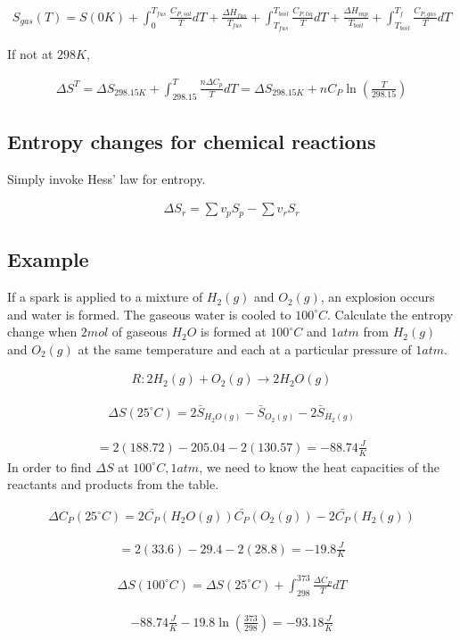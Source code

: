 \documentclass[12pt]{book}
\begin{document}
\begin{align*}
    S_{gas}(T)=S(0K)+\int_{0}^{T_{fus}}\frac{C_{P,sol}}{T} dT+\frac{\Delta H_{fus}}{T_{fus}}+\int_{T_{fus}}^{T_{boil}}\frac{C_{P,liq}}{T} dT+\frac{\Delta H_{vap}}{T_{boil}}+\int_{T_{boil}}^{T_{f}}\frac{C_{P,gas}}{T}dT
\end{align*}

If not at $298K$,

\begin{align*}
    \Delta S^T=\Delta S_{298.15K}+\int_{298.15}^{T}\frac{n\Delta C_p}{T}dT=\Delta S_{298.15K}+nC_P\ln\left(\frac{T}{298.15}\right)
\end{align*}

\subsection*{Entropy changes for chemical reactions}

Simply invoke Hess' law for entropy.

\begin{align*}
    \Delta S_r=\sum v_p S_{p}-\sum v_r S_r
\end{align*}

\subsection*{Example}

If a spark is applied to a mixture of $H_2(g)$ and $O_2(g)$, an explosion occurs and
water is formed. The gaseous water is cooled to $100^{\circ}C$. Calculate the entropy
change when $2 mol$ of gaseous $H_2O$ is formed at $100^{\circ}C$ and $1 atm$ from $H_2(g)$
and $O_2(g)$ at the same temperature and each at a particular pressure of $1 atm$.

\begin{align*}
    R:2H_2(g)+O_2(g)\rightarrow2H_2O(g)
\end{align*}

\begin{align*}
    \Delta S(25^{\circ}C)=2\bar{S}_{H_2O(g)}-\bar{S}_{O_2(g)}-2\bar{S}_{H_2(g)}
\end{align*}

\begin{align*}
    =2(188.72)-205.04-2(130.57)=-88.74\frac{J}{K}
\end{align*}
In order to find $\Delta S$ at $100^{\circ}C, 1atm$, we need to know the heat capacities of the reactants and products from the table.

\begin{align*}
    \Delta C_P(25^{\circ}C)=2\bar{C_P}(H_2O(g))\bar{C_P}(O_2(g))-2\bar{C_P}(H_2(g))
\end{align*}

\begin{align*}
    =2(33.6)-29.4-2(28.8)=-19.8\frac{J}{K}
\end{align*}

\begin{align*}
    \Delta S(100^{\circ}C)=\Delta S(25^{\circ}C)+\int_{298}^{373}\frac{\Delta C_P}{T} dT
\end{align*}

\begin{align*}
    -88.74\frac{J}{K}-19.8\ln\left(\frac{373}{298}\right)=-93.18\frac{J}{K}
\end{align*}
\end{document}
